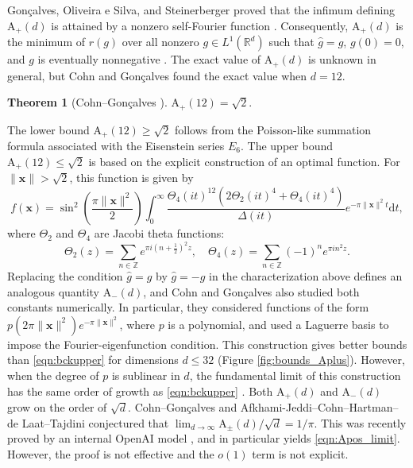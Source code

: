 \documentclass[10pt,reqno]{amsproc}
\newcommand{\what}[1]{\widehat{#1}}
\newcommand{\dd}{\mathrm{d}}
\newcommand{\rA}{\mathrm{A}}
\newcommand{\bZ}{\mathbb{Z}}
\newcommand{\bx}{\mathbf{x}}
\newcommand{\1}{\mathds{1}}	%
\theoremstyle{definition}
\newtheorem{theorem}{Theorem}[section]
\theoremstyle{remark}
\begin{document}
Gon{\c{c}}alves, Oliveira e Silva, and Steinerberger proved that the infimum defining $\rA_+(d)$ is attained by a nonzero self-Fourier function \cite{gonccalves2017hermite}. Consequently, $\rA_+(d)$ is the minimum of $r(g)$ over all nonzero $g \in L^{1}(\mathbb{R}^{d})$ such that $\what{g} = g$, $g(0) = 0$, and $g$ is eventually nonnegative \cite[Problem 1.1]{cohn2019optimal}.
The exact value of $\rA_+(d)$ is unknown in general, but Cohn and Gon{\c{c}}alves found the exact value when $d = 12$.
\begin{theorem}[{Cohn--Gon{\c{c}}alves \cite[Theorem 1.2]{cohn2019optimal}}]
$\rA_+(12) = \sqrt{2}$.
\end{theorem}
The lower bound $\rA_+(12) \ge \sqrt{2}$ follows from the Poisson-like summation formula associated with the Eisenstein series $E_6$.
The upper bound $\rA_+(12) \le \sqrt{2}$ is based on the explicit construction of an optimal function. For $\|\bx\|>\sqrt{2}$, this function is given by
\[
f(\bx) = \sin^2\left(\frac{\pi\|\bx\|^2}{2}\right) \int_{0}^{\infty} \frac{\Theta_4(it)^{12}(2\Theta_2(it)^4 + \Theta_4(it)^4)}{\Delta(it)} e^{-\pi \|\bx\|^2 t} \dd t,
\]
where $\Theta_2$ and $\Theta_4$ are Jacobi theta functions:
\begin{equation}
    \label{eqn:jacobi_theta}
    \Theta_2(z) = \sum_{n \in \bZ} e^{\pi i (n + \frac{1}{2})^2 z}, \quad \Theta_4(z) = \sum_{n \in \bZ} (-1)^{n} e^{\pi i n^2 z}.
\end{equation}
Replacing the condition $\what{g} = g$ by $\what{g} = -g$ in the characterization above defines an analogous quantity $\rA_-(d)$, and Cohn and Gon{\c{c}}alves also studied both constants numerically.
In particular, they considered functions of the form $p(2\pi \|\bx\|^2) e^{-\pi \|\bx\|^2}$, where $p$ is a polynomial, and used a Laguerre basis to impose the Fourier-eigenfunction condition.
This construction gives better bounds than \eqref{eqn:bckupper} for dimensions $d \le 32$ (Figure \ref{fig:bounds_Aplus}). However, when the degree of $p$ is sublinear in $d$, the fundamental limit of this construction has the same order of growth as \eqref{eqn:bckupper} \cite{cohn2024sign}.
Both $\rA_+(d)$ and $\rA_-(d)$ grow on the order of $\sqrt{d}$.
Cohn--Gon{\c{c}}alves \cite[Conjecture 1.5]{cohn2019optimal} and Afkhami-Jeddi--Cohn--Hartman--de Laat--Tajdini \cite[(3.5)]{afkhami2020high} conjectured that $\lim_{d \to \infty} \rA_{\pm}(d)/\sqrt{d} = 1/\pi$. This was recently proved by an internal OpenAI model \cite[Chapter 1, Theorem 1.2]{openai10}, and in particular yields \eqref{eqn:Apos_limit}.
However, the proof is not effective and the $o(1)$ term is not explicit.
\end{document}
